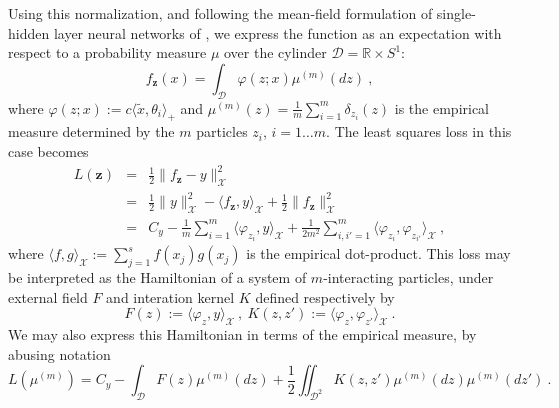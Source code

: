 Using this normalization, and following the mean-field formulation of single-hidden layer neural networks of \cite{meimontanari, chizat2018global, rotskoffeve}, we express the function as an expectation with respect to a probability measure $\mu$ over the cylinder $\mathcal{D} = \mathbb{R} \times S^1$:
\begin{equation}
    f_\mathbf{z}(x) = \int_\mathcal{D} \varphi(z;x) \mu^{(m)}(dz)~,
\end{equation}
where $\varphi(z;x):=c \langle \tilde{x}, \theta_i \rangle_+$ and $\mu^{(m)}(z) = \frac{1}{m} \sum_{i=1}^m \delta_{z_i}(z)$ 
is the empirical measure determined by the $m$ particles $z_i$, $i=1\dots m$.
The least squares loss in this case becomes 
\begin{eqnarray}
    L(\mathbf{z}) &=& \frac{1}{2}\| f_\mathbf{z} - y \|_\mathcal{X}^2 \\
    &=& \frac{1}{2}\| y\|^2_\mathcal{X} - \langle f_\mathbf{z} , y \rangle_\mathcal{X} + \frac{1}{2}\| f_\mathbf{z} \|^2_\mathcal{X} \\
    &=& C_y - \frac{1}{m} \sum_{i=1}^m \langle \varphi_{z_i} , y \rangle_\mathcal{X} + \frac{1}{2m^2} \sum_{i,i'=1}^m \langle \varphi_{z_i} ,\varphi_{z_{i'}} \rangle_\mathcal{X} ~,
\end{eqnarray}
where $\langle f, g \rangle_\mathcal{X} := \sum_{j=1}^s f(x_j) g(x_j)$ is the empirical dot-product. 
This loss may be interpreted as the Hamiltonian of a system of $m$-interacting particles, under external 
field $F$ and interation kernel $K$ defined respectively by 
\begin{equation}
F(z):= \langle \varphi_z, y \rangle_\mathcal{X} ~,~K(z, z'):= \langle \varphi_{z} ,\varphi_{z'} \rangle_\mathcal{X}~.    
\end{equation}
We may also express this Hamiltonian in terms of the empirical measure, by abusing notation
$$L(\mu^{(m)}) = C_y - \int_\mathcal{D} F(z) \mu^{(m)}(dz) + \frac{1}{2} \iint_{\mathcal{D}^2} K(z,z') \mu^{(m)}(dz) \mu^{(m)}(dz')~.$$

